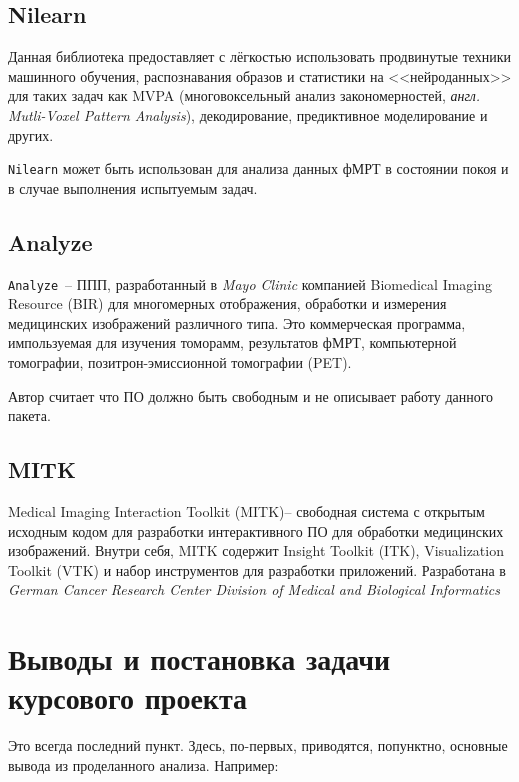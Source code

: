 \subsection{Nilearn}
Данная библиотека предоставляет с лёгкостью использовать продвинутые техники машинного обучения, распознавания образов и статистики на <<нейроданных>> для таких задач как MVPA (многовоксельный анализ закономерностей, \textit{англ. Mutli-Voxel Pattern Analysis}), декодирование, предиктивное моделирование и других.

\texttt{Nilearn} может быть использован для анализа данных фМРТ в состоянии покоя и в случае выполнения испытуемым задач.

\subsection{Analyze}
\texttt{Analyze}~-- ППП, разработанный в \textit{Mayo Clinic} компанией Biomedical Imaging Resource (BIR) для многомерных отображения, обработки и измерения медицинских изображений различного типа. Это коммерческая программа, импользуемая для изучения томорамм, результатов фМРТ, компьютерной томографии, позитрон-эмиссионной томографии (PET).

Автор считает что ПО должно быть свободным и не описывает работу данного пакета.

\subsection{MITK}
Medical Imaging Interaction Toolkit (MITK)-- свободная система с открытым исходным кодом для разработки интерактивного
ПО для обработки медицинских изображений. Внутри себя, MITK содержит Insight Toolkit (ITK), Visualization Toolkit (VTK) и набор инструментов для разработки приложений. Разработана в \textit{German Cancer Research Center
Division of Medical and Biological Informatics}


\section{Выводы и постановка задачи курсового проекта}

Это всегда последний пункт. Здесь, по-первых, приводятся, попунктно, основные вывода из проделанного анализа. Например:

